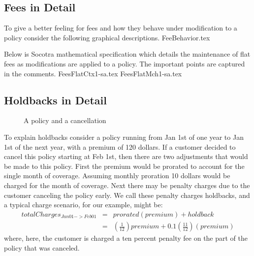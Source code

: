 \subsection{Fees in Detail}
To give a better feeling for fees and how they behave under modification to a policy consider the following
graphical descriptions.
{FeeBehavior.tex}
\newpage

Below is Socotra mathematical specification which details the maintenance of flat fees as modifications are applied to a
policy. The important points are captured in the comments.
{FeesFlatCtx1-sa.tex}
{FeesFlatMch1-sa.tex}

\subsection{Holdbacks in Detail}

\begin{figure}[ht]
  \caption{
    A policy and a cancellation
  }
  \label{ch03:fig:3:2}
\end{figure}

To explain holdbacks consider a policy running from Jan 1st of one year to Jan 1st of the next year, with a
premium of 120 dollars. If
a customer decided to cancel this policy starting at Feb 1st, then there are two adjustments that would
be made to this policy. First the premium would be prorated to account for the single month of coverage.
Assuming monthly proration 10 dollars would be charged for the month of coverage. Next there may be penalty
charges due to the customer canceling the policy early. We call these penalty charges holdbacks, and a typical
charge scenario, for our example, might be:
\begin{eqnarray*}
totalCharges_{Jan01->Feb01} & = & prorated(premium) + holdback \\
                          & = & (\frac{1}{12}) premium + 0.1(\frac{11}{12})(premium)
\end{eqnarray*}
where, here, the customer is charged a ten percent penalty fee on the part of the policy that was canceled.


